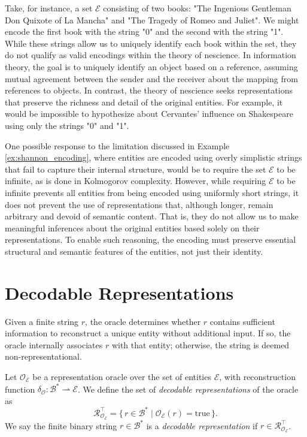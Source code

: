 \begin{example}
\label{ex:shannon_encoding}
Take, for instance, a set $\mathcal{E}$ consisting of two books: "The Ingenious Gentleman Don Quixote of La Mancha" and "The Tragedy of Romeo and Juliet". We might encode the first book with the string "0" and the second with the string "1". While these strings allow us to uniquely identify each book within the set, they do not qualify as valid encodings within the theory of nescience. In information theory, the goal is to uniquely identify an object based on a reference, assuming mutual agreement between the sender and the receiver about the mapping from references to objects. In contrast, the theory of nescience seeks representations that preserve the richness and detail of the original entities. For example, it would be impossible to hypothesize about Cervantes' influence on Shakespeare using only the strings "0" and "1".
\end{example}

One possible response to the limitation discussed in Example \ref{ex:shannon_encoding}, where entities are encoded using overly simplistic strings that fail to capture their internal structure, would be to require the set $\mathcal{E}$ to be infinite, as is done in Kolmogorov complexity. However, while requiring $\mathcal{E}$ to be infinite prevents all entities from being encoded using uniformly short strings, it does not prevent the use of representations that, although longer, remain arbitrary and devoid of semantic content. That is, they do not allow us to make meaningful inferences about the original entities based solely on their representations. To enable such reasoning, the encoding must preserve essential structural and semantic features of the entities, not just their identity.

%
%

\section{Decodable Representations}
\label{sec:decodable_representations}

Given a finite string $r$, the oracle determines whether $r$ contains sufficient information to reconstruct a unique entity without additional input. If so, the oracle internally associates $r$ with that entity; otherwise, the string is deemed non-representational.

\begin{definition}
Let \(\mathcal{O}_{\mathcal{E}}\) be a representation oracle over the set of entities \(\mathcal{E}\), with  reconstruction function
\(\delta_{\mathcal O} : \mathcal{B}^\ast \rightharpoonup \mathcal{E}\).
We define the set of \emph{decodable representations} of the oracle as
\[
\mathcal{R}_{\mathcal{O}_{\mathcal{E}}}^{\top}
=
\{\, r \in \mathcal{B}^\ast \mid \mathcal{O}_{\mathcal{E}}(r)=\mathrm{true} \,\}.
\]
We say the finite binary string $r \in \mathcal{B}^\ast$ is a \emph{decodable representation} if $r \in \mathcal{R}_{\mathcal{O}_{\mathcal{E}}}^{\top}$.
\end{definition}

